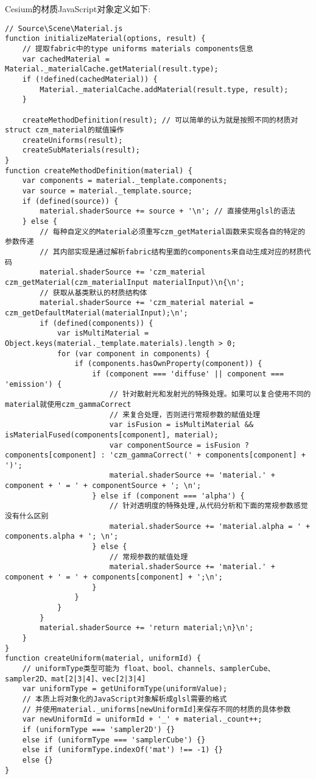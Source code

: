Cesium的材质JavaScript对象定义如下: 
\begin{lstlisting}
// Source\Scene\Material.js
function initializeMaterial(options, result) {
    // 提取fabric中的type uniforms materials components信息
    var cachedMaterial = Material._materialCache.getMaterial(result.type);
    if (!defined(cachedMaterial)) {
        Material._materialCache.addMaterial(result.type, result);
    }

    createMethodDefinition(result); // 可以简单的认为就是按照不同的材质对struct czm_material的赋值操作
    createUniforms(result);
    createSubMaterials(result);
}
function createMethodDefinition(material) {
    var components = material._template.components;
    var source = material._template.source;
    if (defined(source)) {
        material.shaderSource += source + '\n'; // 直接使用glsl的语法
    } else {
        // 每种自定义的Material必须重写czm_getMaterial函数来实现各自的特定的参数传递
        // 其内部实现是通过解析fabric结构里面的components来自动生成对应的材质代码
        material.shaderSource += 'czm_material czm_getMaterial(czm_materialInput materialInput)\n{\n';
        // 获取从基类默认的材质结构体
        material.shaderSource += 'czm_material material = czm_getDefaultMaterial(materialInput);\n';
        if (defined(components)) {
            var isMultiMaterial = Object.keys(material._template.materials).length > 0;
            for (var component in components) {
                if (components.hasOwnProperty(component)) {
                    if (component === 'diffuse' || component === 'emission') {
                        // 针对散射光和发射光的特殊处理。如果可以复合使用不同的material就使用czm_gammaCorrect
                        // 来复合处理，否则进行常规参数的赋值处理
                        var isFusion = isMultiMaterial && isMaterialFused(components[component], material);
                        var componentSource = isFusion ? components[component] : 'czm_gammaCorrect(' + components[component] + ')';
                        material.shaderSource += 'material.' + component + ' = ' + componentSource + '; \n';
                    } else if (component === 'alpha') {
                        // 针对透明度的特殊处理,从代码分析和下面的常规参数感觉没有什么区别
                        material.shaderSource += 'material.alpha = ' + components.alpha + '; \n';
                    } else {
                        // 常规参数的赋值处理
                        material.shaderSource += 'material.' + component + ' = ' + components[component] + ';\n';
                    }
                }
            }
        }
        material.shaderSource += 'return material;\n}\n';
    }
}
function createUniform(material, uniformId) {
    // uniformType类型可能为 float、bool、channels、samplerCube、sampler2D、mat[2|3|4]、vec[2|3|4]
    var uniformType = getUniformType(uniformValue);
    // 本质上将对象化的JavaScript对象解析成glsl需要的格式
    // 并使用material._uniforms[newUniformId]来保存不同的材质的具体参数
    var newUniformId = uniformId + '_' + material._count++;
    if (uniformType === 'sampler2D') {}
    else if (uniformType === 'samplerCube') {}
    else if (uniformType.indexOf('mat') !== -1) {}
    else {}
}
\end{lstlisting}   

